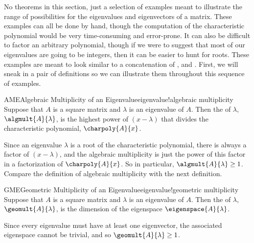 %
%
No theorems in this section, just a selection of examples meant to illustrate the range of possibilities for the eigenvalues and eigenvectors of a matrix.  These examples can all be done by hand, though the computation of the characteristic polynomial would be very time-consuming and error-prone.  It can also be difficult to factor an arbitrary polynomial, though if we were to suggest that most of our eigenvalues are going to be integers, then it can be easier to hunt for roots.  These examples are meant to look similar to a concatenation of ,  and .  First, we will sneak in a pair of definitions so we can illustrate them throughout this sequence of examples.
%
\begin{definition}{AME}{Algebraic Multiplicity of an Eigenvalue}{eigenvalue!algebraic multiplicity}
Suppose that $A$ is a square matrix and $\lambda$ is an eigenvalue of $A$.  Then the  of $\lambda$, $\algmult{A}{\lambda}$, is the highest power of $(x-\lambda)$ that divides the characteristic polynomial, $\charpoly{A}{x}$.
\end{definition}
%
Since an eigenvalue $\lambda$ is a root of the characteristic polynomial, there is always a factor of $(x-\lambda)$, and the algebraic multiplicity is just the power of this factor in a factorization of $\charpoly{A}{x}$.  So in particular, $\algmult{A}{\lambda}\geq 1$.  Compare the definition of algebraic multiplicity with the next definition.
%
\begin{definition}{GME}{Geometric Multiplicity of an Eigenvalue}{eigenvalue!geometric multiplicity}
Suppose that $A$ is a square matrix and $\lambda$ is an eigenvalue of $A$.  Then the  of $\lambda$, $\geomult{A}{\lambda}$, is the dimension of the eigenspace $\eigenspace{A}{\lambda}$.
\end{definition}
%
Since every eigenvalue must have at least one eigenvector, the associated eigenspace cannot be trivial, and so $\geomult{A}{\lambda}\geq 1$.
%
